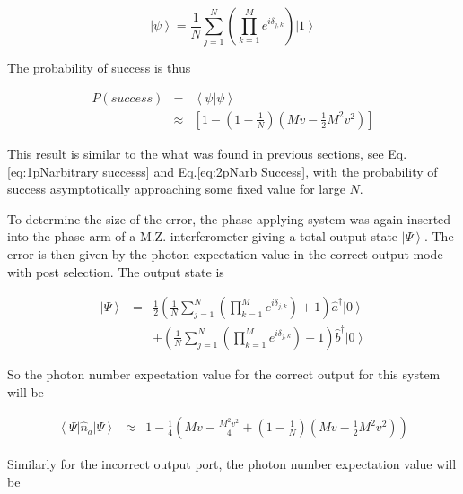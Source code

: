 \documentclass[aps,pra,twocolumn,superscriptaddress,numerical]{revtex4-1}
\begin{document}
		\begin{equation}
		\left|\psi\right\rangle =\frac{1}{N}\sum_{j=1}^{N}\left(\prod_{k=1}^{M}e^{i\delta_{j,k}}\right)\left|1\right\rangle \label{eq:AvEndPhaseState}
		\end{equation}
		
		
		The probability of success is thus
		
		\begin{eqnarray}
		P\left(success\right) & = & \left\langle \psi|\psi\right\rangle \nonumber \\
		& \approx & \left[1-\left(1-\frac{1}{N}\right)\left(Mv-\frac{1}{2}M^{2}v^{2}\right)\right]\label{eq:AveEndProbSuccess}
		\end{eqnarray}
		
		
		This result is similar to the what was found in previous sections, see Eq.\ref{eq:1pNarbitrary successs} and Eq.\ref{eq:2pNarb Success}, with the probability of success asymptotically approaching some fixed value for large $N$.
		
		To determine the size of the error, the phase applying system was again inserted into the phase arm of a M.Z. interferometer giving a total output state $\left|\Psi\right\rangle $. The error is then given by the photon expectation value in the correct output mode with post selection. The output state is
		
		\begin{eqnarray}
		\left|\Psi\right\rangle & = &\frac{1}{2}\left(\frac{1}{N}\sum_{j=1}^{N}\left(\prod_{k=1}^{M}e^{i\delta_{j,k}}\right)+1\right)\hat{a}^{\dagger}\left|0\right\rangle \\ & & +\left(\frac{1}{N}\sum_{j=1}^{N}\left(\prod_{k=1}^{M}e^{i\delta_{j,k}}\right)-1\right)\hat{b}^{\dagger}\left|0\right\rangle \label{eq:AveEndIntState}
		\end{eqnarray}
		
		
		So the photon number expectation value for the correct output for this system will be
		
		\begin{widetext}
			\begin{eqnarray}
			\left\langle \Psi\right|\hat{n}_{a}\left|\Psi\right\rangle  
			& \approx & 1-\frac{1}{4}\left(Mv-\frac{M^{2}v^{2}}{4}+\left(1-\frac{1}{N}\right)\left(Mv-\frac{1}{2}M^{2}v^{2}\right)\right)
			\end{eqnarray}
		\end{widetext}	
		
		Similarly for the incorrect output port, the photon number expectation value will be
		
\end{document}
